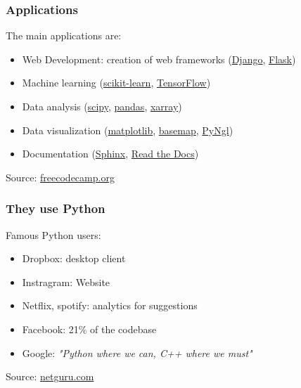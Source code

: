 \begin{frame}[fragile]
\frametitle{Applications}

The main applications are:
\vspace{1em}

\begin{itemize}
\item{Web Development: creation of web frameworks (\href{https://www.djangoproject.com/}{Django}, \href{https://www.palletsprojects.com/p/flask/}{Flask})}
\item{Machine learning (\href{https://scikit-learn.org/}{scikit-learn}, \href{https://www.tensorflow.org/}{TensorFlow})}
\item{Data analysis (\href{https://www.scipy.org/}{scipy}, \href{https://pandas.pydata.org/}{pandas}, \href{http://xarray.pydata.org/en/stable/}{xarray})}
\item{Data visualization (\href{http://xarray.pydata.org/en/stable/}{matplotlib}, \href{https://matplotlib.org/basemap/}{basemap}, \href{https://www.pyngl.ucar.edu/}{PyNgl})}
\item{Documentation (\href{https://www.sphinx-doc.org/en/master/}{Sphinx}, \href{https://readthedocs.org/}{Read the Docs})}
\end{itemize}
\vspace{1em}
Source: \href{https://www.freecodecamp.org/news/what-can-you-do-with-python-the-3-main-applications-518db9a68a78/}{freecodecamp.org}
\end{frame}

\begin{frame}[fragile]
\frametitle{They use Python}

Famous Python users:
\vspace{1em}

\begin{itemize}
\item{Dropbox: desktop client}
\item{Instragram: Website}
\item{Netflix, spotify: analytics for suggestions}
\item{Facebook: 21\% of the codebase}
\item{Google: \emph{"Python where we can, C++ where we must"}}
\end{itemize}
\vspace{1em}
Source: \href{https://www.netguru.com/blog/8-top-companies-that-use-python-for-their-apps-examples-of-top-notch-python-applications}{netguru.com}

\end{frame}

